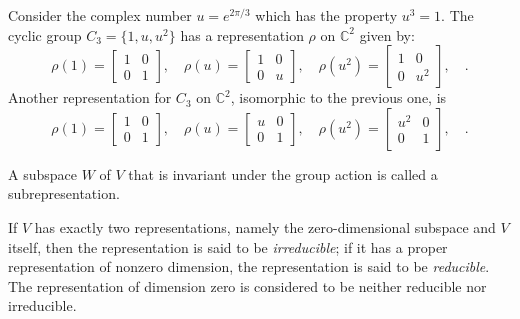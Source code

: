 \begin{example}
  Consider the complex number $u = e^{2\pi/3}$ which has the property $u^3=1$.
  The cyclic group $C_3 = \{1,u,u^2\}$ has a representation $\rho$ on
  $\mathbb{C}^2$ given by:
  \begin{equation}
    \rho(1) = \begin{bmatrix} 1 & 0\\ 0 & 1\end{bmatrix},\quad 
    \rho(u) = \begin{bmatrix} 1 & 0\\ 0 & u\end{bmatrix},\quad
    \rho(u^2) = \begin{bmatrix} 1 & 0\\ 0 & u^2\end{bmatrix},\quad.
  \end{equation}
Another representation for $C_3$ on $\mathbb{C}^2$, isomorphic to the previous
one, is
  \begin{equation}
    \rho(1) = \begin{bmatrix} 1 & 0\\ 0 & 1\end{bmatrix},\quad 
    \rho(u) = \begin{bmatrix} u & 0\\ 0 & 1\end{bmatrix},\quad
    \rho(u^2) = \begin{bmatrix} u^2 & 0\\ 0 & 1\end{bmatrix},\quad.
  \end{equation}
\end{example}

\begin{definition}[Subrepresentation]
  A subspace $W$ of $V$ that is invariant under the group action is called
  a subrepresentation.
\end{definition}

\begin{definition}
  If $V$ has exactly two representations, namely the zero-dimensional subspace
  and $V$ itself, then the representation is said to be \textit{irreducible};
  if it has a proper representation of nonzero dimension, the representation is
  said to be \textit{reducible}. The representation of dimension zero is
  considered to be neither reducible nor irreducible.
\end{definition}

